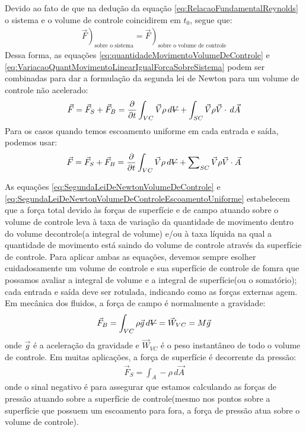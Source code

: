 \documentclass{article}
\newcommand{\stkout}[1]{\ifmmode\text{\sout{\ensuremath{#1}}}\else\sout{#1}\fi}
\begin{document}
Devido ao fato de que na dedução da equação \ref{eq:RelacaoFundamentalReynolds} o sistema e o volume de controle coincidirem em $t_0$, segue que:
\begin{align*}
  \left.\vec{F}\right)_{\text{sobre o sistema}}=\left.\vec{F}\right)_{\text{sobre o volume de controle}}
\end{align*}
Dessa forma, as equações \ref{eq:quantidadeMovimentoVolumeDeControle} e \ref{eq:VariacaoQuantMovimentoLinearIgualForcaSobreSistema} podem ser combinadas para dar a formulação da segunda lei de Newton para um volume de controle não acelerado:
\begin{equation}
  \vec{F}=\vec{F}_S+\vec{F}_B=\frac{\partial}{\partial t}\int_{VC}^{ } \vec{V} \rho \, d\stkout{V} + \int_{SC}^{ } \vec{V} \rho \vec{V} \cdot \, d\vec{A}
  \label{eq:SegundaLeiDeNewtonVolumeDeControle}
\end{equation}
Para os casos quando temos escoamento uniforme em cada entrada e saída, podemos usar:
\begin{equation}
  \vec{F}=\vec{F}_S+\vec{F}_B=\frac{\partial}{\partial t}\int_{VC}^{ } \vec{V} \rho \, d\stkout{V} + \sum\nolimits_{SC} \vec{V}\rho\vec{V}\cdot\vec{A}
  \label{eq:SegundaLeiDeNewtonVolumeDeControleEscoamentoUniforme}
\end{equation}

As equações \ref{eq:SegundaLeiDeNewtonVolumeDeControle} e \ref{eq:SegundaLeiDeNewtonVolumeDeControleEscoamentoUniforme} estabelecem que a força total devido às forças de superfície e de campo atuando sobre o volume de controle leva à taxa de variação da quantidade de movimento dentro do volume decontrole(a integral de volume) e/ou à taxa líquida na qual a quantidade de movimento está saindo do volume de controle através da superfície de controle.
Para aplicar ambas as equações, devemos sempre esolher cuidadosamente um volume de controle e sua superfície de controle de fomra que possamos avaliar a integral de volume e a integral de superfície(ou o somatório); cada entrada e saída deve ser rotulada, indicando como as forças externas agem. Em mecânica dos fluidos, a força de campo é normalmente a gravidade:
\begin{align*}
  \vec{F}_B=\int_{VC}^{ } \rho \vec{g}\, d\stkout{V}=\vec{W}_{VC}=M\vec{g}
\end{align*}
onde $\vec{g}$ é a aceleração da gravidade e $\vec{W}_{VC}$ é o peso instantâneo de todo o volume de controle. Em muitas aplicações, a força de superfície é decorrente da pressão:
\begin{align*}
  \vec{F}_S = \int_{A}^{ } -\rho \, d\vec{A}
\end{align*}
onde o sinal negativo é para assegurar que estamos calculando as forças de pressão atuando sobre a superfície de controle(mesmo nos pontos sobre a superfície que possuem um escoamento para fora, a força de pressão atua sobre o volume de controle).
\end{document}
